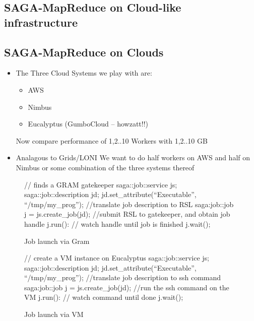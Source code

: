 \documentclass[conference,final]{IEEEtran}
\begin{document}
\subsection{SAGA-MapReduce on Cloud-like infrastructure}

\subsection{SAGA-MapReduce on Clouds}

\begin{itemize}
\item  The Three Cloud Systems we play with are:
\begin{itemize}
\item AWS
\item Nimbus
\item Eucalyptus (GumboCloud -- howzatt!!)
\end{itemize}
Now compare performance of 1,2..10 Workers with 1,2..10 GB
\item Analagous to Grids/LONI We want to do half workers on AWS and half 
on Nimbus or some combination of the three systems thereof
\end{itemize}

\begin{figure}[!ht]
 \begin{center}
  \begin{mycode}[label=SAGA Job Launch via GRAM gatekeeper]
   {// finds a GRAM gatekeeper
    saga::job::service js;
    saga::job::description jd;
    jd.set_attribute(``Executable'', ``/tmp/my_prog'');
    //translate job description to RSL
    saga:job::job j = js.create_job(jd);
    //submit RSL to gatekeeper, and obtain job handle
    j.run():
    // watch handle until job is finished
    j.wait();
   } 
  \end{mycode}
  \caption{\label{gramjob}Job launch via Gram }
 \end{center}
\end{figure}


\begin{figure}[!ht]
 \begin{center}
  \begin{mycode}[label=SAGA create a VM instance on Eucalyptus]
   {// create a VM instance on Eucalyptus
    saga::job::service js;
    saga::job::description jd;
    jd.set_attribute(``Executable'', ``/tmp/my_prog'');
    //translate job description to ssh command
    saga:job::job j = js.create_job(jd);
    //run the ssh command on the VM
    j.run():
    // watch command until done
    j.wait();
   } 
  \end{mycode}
  \caption{\label{vmjob} Job launch via VM}
 \end{center}
\end{figure}
\end{document}
